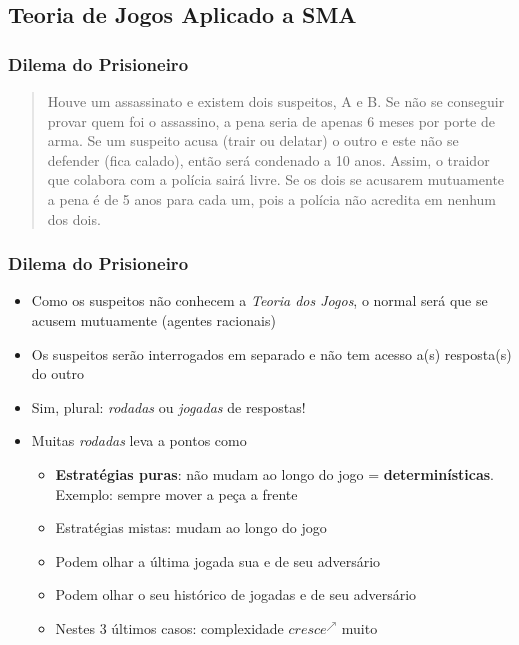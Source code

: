 \subsection{Teoria de Jogos Aplicado a SMA}
\begin{frame}

    \frametitle{Dilema do Prisioneiro}
   
    
\begin{quotation}
        Houve um assassinato e existem dois suspeitos, A e B. Se não se conseguir provar quem foi o assassino, a pena seria de apenas 6 meses por porte de arma.
Se um suspeito acusa (trair ou delatar) o outro e este não se defender (fica calado), então  será condenado a 10 anos. Assim, o traidor que colabora com a polícia sairá livre. Se os dois se acusarem mutuamente a pena é de 5 anos para cada um, pois a
polícia não acredita em nenhum dos dois.
    \end{quotation}
    

   
\end{frame}
    
\begin{frame}

    \frametitle{Dilema do Prisioneiro}
   
\begin{itemize}
  
  \item Como os suspeitos não conhecem a \textit{Teoria dos Jogos}, o normal será que se acusem mutuamente (agentes racionais)
    
  \item Os suspeitos serão interrogados em separado e não tem acesso a(s) resposta(s) do outro

\item Sim, plural: \textit{rodadas} ou \textit{jogadas} de respostas!

\item Muitas \textit{rodadas} leva a pontos como

\begin{itemize}
  \item \textbf{Estratégias puras}: não mudam ao longo do jogo = \textbf{determinísticas}. Exemplo: sempre mover a peça a frente
  
  
  \item Estratégias mistas: mudam ao longo do jogo 
  
  \item Podem olhar a última jogada sua e  de seu adversário
  
  \item Podem olhar o seu histórico de jogadas e  de seu adversário
  
  \item Nestes 3 últimos casos: complexidade $cresce^{\nearrow }$ muito
\end{itemize}


\end{itemize}

   
\end{frame}

